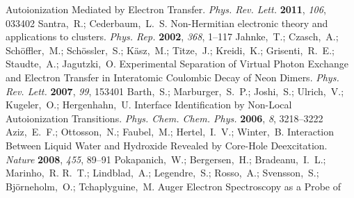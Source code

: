 \documentclass[journal=jpccck,manuscript=article]{achemso}
\begin{document}
\begin{mcitethebibliography}{73}
  Autoionization Mediated by Electron Transfer. \emph{Phys. Rev. Lett.}
  \textbf{2011}, \emph{106}, 033402\relax
\mciteBstWouldAddEndPuncttrue
\mciteSetBstMidEndSepPunct{\mcitedefaultmidpunct}
{\mcitedefaultendpunct}{\mcitedefaultseppunct}\relax
\EndOfBibitem
{}
Santra,~R.; Cederbaum,~L.~S. Non-Hermitian electronic theory and applications
  to clusters. \emph{Phys. Rep.} \textbf{2002}, \emph{368}, 1--117\relax
\mciteBstWouldAddEndPuncttrue
\mciteSetBstMidEndSepPunct{\mcitedefaultmidpunct}
{\mcitedefaultendpunct}{\mcitedefaultseppunct}\relax
\EndOfBibitem
{}
Jahnke,~T.; Czasch,~A.; Sch\"offler,~M.; Sch\"ossler,~S.; K\"asz,~M.;
  Titze,~J.; Kreidi,~K.; Grisenti,~R.~E.; Staudte,~A.; Jagutzki,~O.
    Experimental Separation of Virtual Photon Exchange and
  Electron Transfer in Interatomic Coulombic Decay of Neon Dimers. \emph{Phys.
  Rev. Lett.} \textbf{2007}, \emph{99}, 153401\relax
\mciteBstWouldAddEndPuncttrue
\mciteSetBstMidEndSepPunct{\mcitedefaultmidpunct}
{\mcitedefaultendpunct}{\mcitedefaultseppunct}\relax
\EndOfBibitem
{}
Barth,~S.; Marburger,~S.~P.; Joshi,~S.; Ulrich,~V.; Kugeler,~O.; Hergenhahn,~U.
  Interface Identification by Non-Local Autoionization Transitions. \emph{Phys.
  Chem. Chem. Phys.} \textbf{2006}, \emph{8}, 3218--3222\relax
\mciteBstWouldAddEndPuncttrue
\mciteSetBstMidEndSepPunct{\mcitedefaultmidpunct}
{\mcitedefaultendpunct}{\mcitedefaultseppunct}\relax
\EndOfBibitem
{}
Aziz,~E.~F.; Ottosson,~N.; Faubel,~M.; Hertel,~I.~V.; Winter,~B. Interaction
  Between Liquid Water and Hydroxide Revealed by Core-Hole Deexcitation.
  \emph{Nature} \textbf{2008}, \emph{455}, 89--91\relax
\mciteBstWouldAddEndPuncttrue
\mciteSetBstMidEndSepPunct{\mcitedefaultmidpunct}
{\mcitedefaultendpunct}{\mcitedefaultseppunct}\relax
\EndOfBibitem
{}
Pokapanich,~W.; Bergersen,~H.; Bradeanu,~I.~L.; Marinho,~R. R.~T.;
  Lindblad,~A.; Legendre,~S.; Rosso,~A.; Svensson,~S.; Bj\"orneholm,~O.;
  Tchaplyguine,~M.   Auger Electron Spectroscopy as a Probe of

\end{mcitethebibliography}
\end{document}

